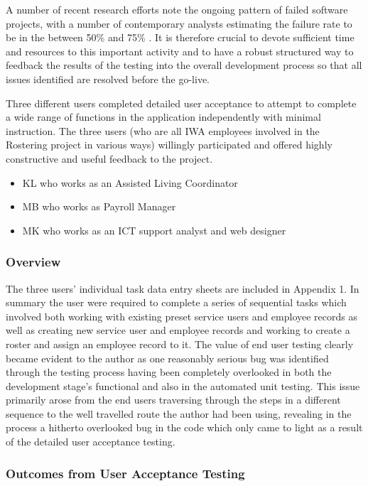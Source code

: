 \documentclass[a4paper,12pt]{article}
\begin{document}
A number of recent research efforts note the ongoing pattern of failed software projects, with a number of contemporary analysts estimating the failure rate to be in the between 50\% \parencite{florentine} and 75\% \parencite{gartner}. It is therefore crucial to devote sufficient time and resources to this important activity and to have a robust structured way to feedback the results of the testing into the overall development process so that all issues identified are resolved before the go-live.

Three different users completed detailed user acceptance to attempt to complete a wide range of functions in the application independently with minimal instruction. The three users (who are all IWA employees involved in the Rostering project in various ways) willingly participated and offered highly constructive and useful feedback to the project. 

\begin{itemize}
\item KL who works as an Assisted Living Coordinator
\item MB who works as Payroll Manager
\item MK who works as an ICT support analyst and web designer
\end{itemize}

\subsubsection{Overview}
The three users' individual task data entry sheets are included in Appendix 1. In summary the user were required to complete a series of sequential tasks which involved both working with existing preset service users and employee records as well as creating new service user and employee records and working to create a roster and assign an employee record to it. The value of end user testing clearly became evident to the author as one reasonably serious bug was identified through the testing process having been completely overlooked in both the development stage's functional and also in the automated unit testing. This issue primarily arose from the end users traversing through the steps in a different sequence to the well travelled route the author had been using, revealing in the process a hitherto overlooked bug in the code which only came to light as a result of the detailed user acceptance testing.

\subsubsection{Outcomes from User Acceptance Testing}
\end{document}
